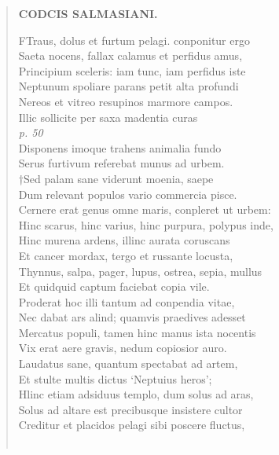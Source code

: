 \documentclass[11pt, a4paper]{report}
\begin{document}
\begin{verse}
    \begin{center} \textbf{CODCIS SALMASIANI.} \end{center} \marginpar{[87]} FTraus, dolus et furtum pelagi. conponitur ergo \\ Saeta nocens, fallax calamus et perfidus amus, \\ Principium sceleris: iam tunc, iam perfidus iste \\ Neptunum spoliare parans petit alta profundi \\ Nereos et vitreo resupinos marmore campos. \\ Illic sollicite  \lbrack per \rbrack  saxa madentia curas \\ \textit{p. 50} \\ Disponens imoque trahens animalia fundo \\ Serus furtivum referebat munus ad urbem. \\ †Sed palam sane viderunt moenia, saepe \\ Dum relevant populos vario commercia pisce. \\ Cernere erat genus omne maris, conpleret ut urbem: \\ Hinc scarus, hinc varius, hinc purpura, polypus inde, \\ Hinc murena ardens, illinc aurata coruscans \\ Et cancer mordax, tergo et russante locusta, \\ Thynnus, salpa, pager, lupus, ostrea, sepia, mullus \\ Et quidquid captum faciebat copia vile. \\ Proderat hoc illi tantum ad conpendia vitae, \\ Nec dabat ars alind; quamvis praedives adesset \\ Mercatus populi, tamen hinc manus ista nocentis \\ Vix erat aere gravis, nedum copiosior auro. \\ Laudatus sane, quantum spectabat ad artem, \\ Et stulte multis dictus ‘Neptuius heros’; \\ Hlinc etiam adsiduus templo, dum solus ad aras, \\ Solus ad altare est precibusque insistere cultor \\ Creditur et placidos pelagi sibi poscere fluctus, \\ 
        ﻿\pagebreak 

\end{verse}
\end{document}
